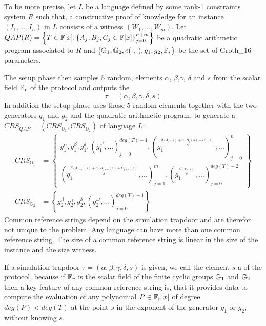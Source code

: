 To be more precise, let $L$ be a language defined by some rank-1 constraints system $R$ such that,  a constructive proof of knowledge for an instance $(I_1,\ldots,I_n)$ in $L$ consists of a witness $(W_1,\ldots,W_m)$. Let $QAP(R) = \left\{T\in \mathbb{F}[x],\left\{A_j,B_j,C_j\in \mathbb{F}[x]\right\}_{j=0}^{n+m}\right\}$ be a quadratic arithmetic program associated to $R$ and $\{\mathbb{G}_1, \mathbb{G}_2, e(\cdot,\cdot), g_1, g_2, \mathbb{F}_r\}$ be the set of Groth\_16 parameters. 

The setup phase then samples $5$ random,  elements $\alpha$, $\beta$,$\gamma$, $\delta$ and $s$ from the scalar field $\mathbb{F}_r$ of the protocol and outputs the 
\begin{equation}
\tau = (\alpha, \beta, \gamma, \delta, s)
\end{equation}
In addition the setup phase uses those $5$ random elements together with the two generators $g_1$ and $g_2$  and the quadratic arithmetic program, to generate a  $CRS_{QAP}= (CRS_{\mathbb{G}_1},CRS_{\mathbb{G}_2})$ of language $L$:
\begin{align*}
CRS_{\mathbb{G}_{1}} &= \textstyle\left\{ \begin{array}{c}
g_1^\alpha,g_1^\beta,g_1^\delta,\left(g_1^{s^j},\ldots\right)_{j=0}^{deg(T)-1},
\left(g_1^{\frac{\beta\cdot A_{j}(s)+\alpha\cdot B_{j}(s)+C_{j}(s)}{\gamma}},\ldots\right)_{j=0}^n\\
\left(g_1^{\frac{\beta\cdot A_{j+n}(s)+\alpha\cdot B_{j+n}(s)+C_{j+n}(s)}{\delta}},\ldots\right)_{j=1}^m,\left(g_1^{\frac{s^{j}\cdot T(s)}{\delta}},\ldots\right)_{j=0}^{deg(T)-2}
\end{array}\right\} \\
CRS_{\mathbb{G}_{2}} &= \left\{g_2^\beta ,g_2^\gamma,g_2^\delta,\left(g_2^{s^j},\ldots\right) _{j=0}^{deg(T)-1}\right\}
\end{align*}
Common reference strings depend on the simulation trapdoor and are therefor not unique to the problem. Any language can have more than one common reference string. The  size of a common reference string is linear in the size of the instance and the size witness.

If a simulation trapdoor $\tau = (\alpha,\beta,\gamma,\delta, s)$ is given, we call the element $s$ a  of the protocol, because if $\mathbb{F}_r$ is the scalar field of the finite cyclic groups $\mathbb{G}_1$ and $\mathbb{G}_2$ then a key feature of any common reference string is, that it provides data to compute the evaluation of any polynomial $P\in \mathbb{F}_r[x]$ of degree $deg(P)<deg(T)$ at the point $s$ in the exponent of the generator $g_1$ or $g_2$, without knowing $s$.

